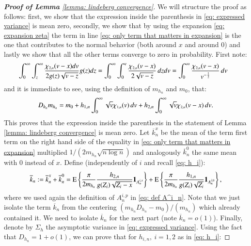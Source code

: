 \begin{proof}[\hypertarget{proof of lemma 7}{\textbf{Proof of Lemma}} \ref{lemma: lindeberg convergence}]
We will structure the proof as follows: first, we show that the expression inside the parenthesis in \eqref{eq: expressed variance} is mean zero, secondly, we show that by using the expansion \eqref{eq: expansion zeta} the term in line \eqref{eq: only term that matters in expansion} is the one that contributes to the normal behavior (both around $x$ and around $0$) and lastly we show that all the other terms converge to zero in probability. 
First note:
\begin{align*}
    &\int_{0}^{\infty} \int_{z}^{\infty} \frac{\chi_{{\scaleto{2,n}{4.5pt}}}(v-x)dv}{2g (z) \sqrt{v-z}}  g(z) dz = \int_{0}^{\infty} \int_{0}^{v} \frac{\chi_{{\scaleto{2,n}{4.5pt}}}(v-x)}{2\sqrt{v-z}} \, dz dv  = \int_{0}^{\infty} \frac{\chi_{{\scaleto{2,n}{4.5pt}}}(v-x)}{v^{-\frac{1}{2}}} \, dv
\end{align*}
and it is immediate to see, using the definition of $m_{h_n}$ and $m_0$, that:
\begin{align}\label{eq: m_{h_n}D_h}
    D_{h_n} m_{h_n} = m_0 + h_{1,n} \int_{0}^{\infty} \sqrt{v} \chi_{{\scaleto{1,n}{4.5pt}}} (v) \, dv + h_{2,n} \int_{0}^{\infty} \sqrt{v} \chi_{{\scaleto{2,n}{4.5pt}}}(v-x) \, dv. 
\end{align}
This proves that the expression inside the parenthesis in the statement of Lemma \ref{lemma: lindeberg convergence} is mean zero. Let $\overline{k}^x_n$ be the mean of the term first term on the right hand side of the equality in \eqref{eq: only term that matters in expansion} multiplied $1/(2m_{h_n} \sqrt{n \log{n}})$ and analogously $\overline{k}^0_n$ the same mean with $0$ instead of $x$. Define (independently of $i$ and recall \eqref{eq: h_i}):
\begin{align*}
    \overline{k}_n := \overline{k}^x_n + \overline{k}^0_n = \mathrm{E} \left\{ \frac{\pi}{2 m_{h_n}} \frac{h_{2,n}}{ g(Z_i) \sqrt{Z_i - x}} \mathbf{1}_{A^{i,x}_n} \right\} + \mathrm{E} \left\{ \frac{\pi}{2 m_{h_n}} \frac{h_{1,n}}{ g(Z_i) \sqrt{Z_i}} \mathbf{1}_{A^{i,0}_n}  \right\}, 
\end{align*}
where we used again the definition of $A^{i,p}_n$ in \eqref{eq: def A^i_n}.
Note that we just isolate the term $\overline{k}_n$ from the centering $(m_{h_n} D_{h_n} - m_0)/(m_{h_n})$ which already contained it. We need to isolate $\overline{k}_n$ for the next part (note $\overline{k}_n = o(1)$). Finally, denote by $\Sigma_h$ the asymptotic variance in \eqref{eq: expressed variance}. Using the fact that $D_{h_n} = 1 + o(1)$, we can prove that for $h_{i,n }, \: i=1,2$ as in \eqref{eq: h_i}:

\end{proof}

